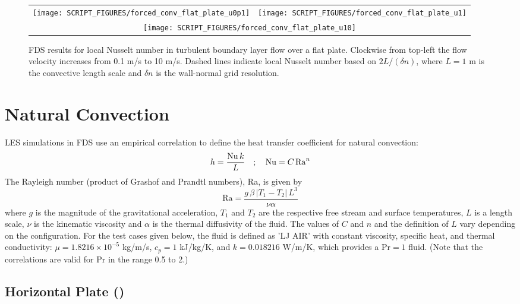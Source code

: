 \documentclass[11pt]{book}
\begin{document}
\begin{figure}[h]
   \begin{tabular*}{\textwidth}{lr}
      \texttt{[image: SCRIPT\_FIGURES/forced\_conv\_flat\_plate\_u0p1]} &
      \texttt{[image: SCRIPT\_FIGURES/forced\_conv\_flat\_plate\_u1]}   \\
      \multicolumn{2}{c}{\texttt{[image: SCRIPT\_FIGURES/forced\_conv\_flat\_plate\_u10]}}
   \end{tabular*}
   \caption[Nusselt correlation local turbulent flat plate]{\label{fig_forced_conv_flat_plate} FDS results for local Nusselt number in turbulent boundary layer flow over a flat plate.  Clockwise from top-left the flow velocity increases from 0.1 m/s to 10 m/s.  Dashed lines indicate local Nusselt number based on $2L/(\delta n)$, where $L=1$ m is the convective length scale and $\delta n$ is the wall-normal grid resolution.}
\end{figure}


\clearpage

\section{Natural Convection}

LES simulations in FDS use an empirical correlation to define the heat transfer coefficient for natural convection:
\begin{equation}
  h = \frac{{\rm Nu} \, k}{L} \quad ; \quad \mathrm{Nu} = C \,\mathrm{Ra}^n
\end{equation}
The Rayleigh number (product of Grashof and Prandtl numbers), Ra, is given by
\begin{equation}
\label{eq:rayleigh_number}
\mathrm{Ra} = \frac{g \, \beta \, |T_1-T_2| \, L^3}{\nu\alpha}
\end{equation}
where $g$ is the magnitude of the gravitational acceleration, $T_1$ and $T_2$ are the respective free stream and surface temperatures, $L$ is a length scale, $\nu$ is the kinematic viscosity and $\alpha$ is the thermal diffusivity of the fluid. The values of $C$ and $n$ and the definition of $L$ vary depending on the configuration. For the test cases given below, the fluid is defined as {\ct 'LJ AIR'} with constant viscosity, specific heat, and thermal conductivity: $\mu = 1.8216 \times 10^{-5}$ \si{kg/m/s}, $c_p = 1$ \si{kJ/kg/K}, and $k = 0.018216$ \si{W/m/K}, which provides a $\mathrm{Pr}=1$ fluid. (Note that the correlations are valid for Pr in the range 0.5 to 2.)

\subsection{Horizontal Plate (\texorpdfstring{}{nat\_conv\_hot\_plate})}
\label{sec:nat_conv_hot_plate}
\end{document}
